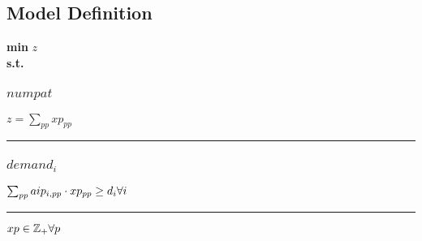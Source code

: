 \documentclass[11pt]{article}
\begin{document}
\subsection*{Model Definition}
\textbf{min} $z$\\
\textbf{s.t.}
\subsubsection*{$numpat$}
$
z = \sum_{pp} xp_{pp}
$
\vspace{5pt}
\hrule
\subsubsection*{$demand_{i}$}
$
\sum_{pp} aip_{i,pp} \cdot xp_{pp} \geq d_{i}\hfill \forall i
$
\vspace{5pt}
\hrule
\bigskip
$xp\in \mathbb{Z}_{+} \forall p\\$
\end{document}

